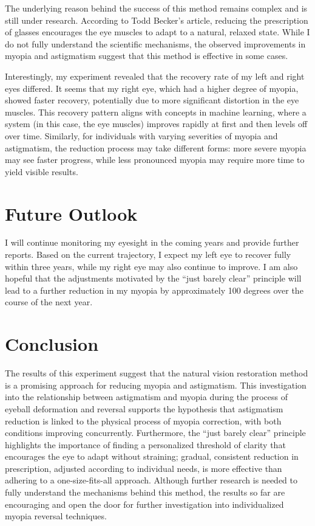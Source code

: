 \documentclass[12pt]{article}
\begin{document}
The underlying reason behind the success of this method remains complex and is still under research. According to Todd Becker's article, reducing the prescription of glasses encourages the eye muscles to adapt to a natural, relaxed state. While I do not fully understand the scientific mechanisms, the observed improvements in myopia and astigmatism suggest that this method is effective in some cases.

Interestingly, my experiment revealed that the recovery rate of my left and right eyes differed. It seems that my right eye, which had a higher degree of myopia, showed faster recovery, potentially due to more significant distortion in the eye muscles. This recovery pattern aligns with concepts in machine learning, where a system (in this case, the eye muscles) improves rapidly at first and then levels off over time. Similarly, for individuals with varying severities of myopia and astigmatism, the reduction process may take different forms: more severe myopia may see faster progress, while less pronounced myopia may require more time to yield visible results.

\section{Future Outlook}
I will continue monitoring my eyesight in the coming years and provide further reports. Based on the current trajectory, I expect my left eye to recover fully within three years, while my right eye may also continue to improve. I am also hopeful that the adjustments motivated by the ``just barely clear'' principle will lead to a further reduction in my myopia by approximately 100 degrees over the course of the next year.

\section{Conclusion}
The results of this experiment suggest that the natural vision restoration method is a promising approach for reducing myopia and astigmatism. This investigation into the relationship between astigmatism and myopia during the process of eyeball deformation and reversal supports the hypothesis that astigmatism reduction is linked to the physical process of myopia correction, with both conditions improving concurrently. Furthermore, the ``just barely clear'' principle highlights the importance of finding a personalized threshold of clarity that encourages the eye to adapt without straining; gradual, consistent reduction in prescription, adjusted according to individual needs, is more effective than adhering to a one-size-fits-all approach. Although further research is needed to fully understand the mechanisms behind this method, the results so far are encouraging and open the door for further investigation into individualized myopia reversal techniques.
\end{document}

